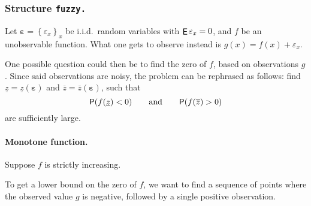 \documentclass[12pt]{article}
\newcommand{\set}[1]{\left\{ #1 \right\}}
\renewcommand{\Pr}{{\sf P}}           %
\DeclareMathOperator{\EV}{{\sf E}}    %
\renewcommand{\vec}[1]{\boldsymbol{#1}}
\begin{document}
\subsubsection*{Structure \tt{fuzzy}.}
Let $\vec{\varepsilon} = \set{\varepsilon _x}_x$ be i.i.d.\ random variables with $\EV \varepsilon _x = 0$, and $f$ be an unobservable function.
What one gets to observe instead is $g(x) = f(x) + \varepsilon _x$.

One possible question could then be to find the zero of $f$, based on observations $g$. Since said observations are noisy, the problem can be rephrased as follows: find $\underline{z} = \underline{z}(\vec{\varepsilon})$ and $\overline{z} = \overline{z}(\vec{\varepsilon})$, such that
\[
    \Pr (f(\underline{z}) < 0)
    \qquad \text{and} \qquad
    \Pr (f(\overline{z}) > 0)
\]
are sufficiently large.

\paragraph{Monotone function.} Suppose $f$ is strictly increasing.

To get a lower bound on the zero of $f$, we want to find a sequence of points where the observed value $g$ is negative, followed by a single positive observation.


\begin{center}
    \newcommand{\f}[1]{0.8*exp(0.25*#1) - 2.4}
    \newcommand{\g}[1]{\f{#1} + 0.7*sin(400*(#1)*(5-#1))}
    \newcommand{\dott}[2][A]{\draw[line#1] (#2,{\g{#2}})--(#2,0); \draw[dot#1] (#2,{\g{#2}}) circle (0.08)}
\end{center}
\end{document}
